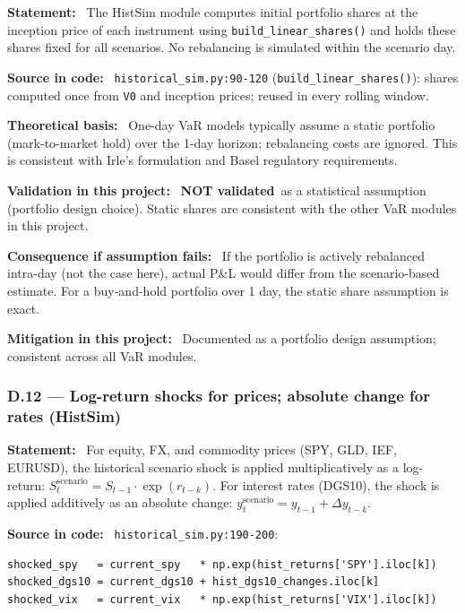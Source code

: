 \documentclass[11pt,a4paper]{article}
\newcommand{\asmfield}[1]{\medskip\noindent\textbf{#1:}\ }
\newcommand{\code}[1]{\texttt{#1}}
\newcommand{\notvalidated}{\textbf{NOT validated}}
\begin{document}
\asmfield{Statement}
The HistSim module computes initial portfolio shares at the inception
price of each instrument using \code{build\_linear\_shares()} and holds
these shares fixed for all scenarios. No rebalancing is simulated within
the scenario day.

\asmfield{Source in code}
\code{historical\_sim.py:90-120} (\code{build\_linear\_shares()}):
shares computed once from \code{V0} and inception prices; reused in
every rolling window.

\asmfield{Theoretical basis}
One-day VaR models typically assume a static portfolio (mark-to-market
hold) over the 1-day horizon; rebalancing costs are ignored. This is
consistent with Irle's formulation and Basel regulatory requirements.

\asmfield{Validation in this project}
\notvalidated\ as a statistical assumption (portfolio design choice).
Static shares are consistent with the other VaR modules in this project.

\asmfield{Consequence if assumption fails}
If the portfolio is actively rebalanced intra-day (not the case here),
actual P\&L would differ from the scenario-based estimate. For a
buy-and-hold portfolio over 1 day, the static share assumption is exact.

\asmfield{Mitigation in this project}
Documented as a portfolio design assumption; consistent across all VaR modules.

\subsubsection{D.12 --- Log-return shocks for prices; absolute change for rates (HistSim)}\label{asm:D12}

\asmfield{Statement}
For equity, FX, and commodity prices (SPY, GLD, IEF, EURUSD), the
historical scenario shock is applied multiplicatively as a log-return:
$S_t^{\text{scenario}} = S_{t-1} \cdot \exp(r_{t-k})$.
For interest rates (DGS10), the shock is applied additively as an absolute
change: $y_t^{\text{scenario}} = y_{t-1} + \Delta y_{t-k}$.

\asmfield{Source in code}
\code{historical\_sim.py:190-200}:
\begin{lstlisting}
shocked_spy   = current_spy   * np.exp(hist_returns['SPY'].iloc[k])
shocked_dgs10 = current_dgs10 + hist_dgs10_changes.iloc[k]
shocked_vix   = current_vix   * np.exp(hist_returns['VIX'].iloc[k])
\end{lstlisting}
\end{document}
